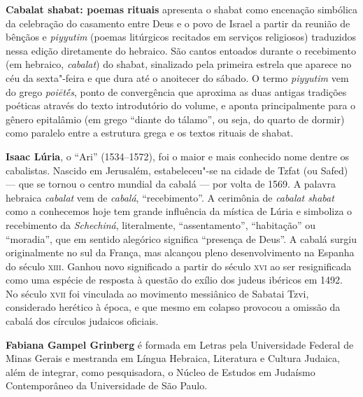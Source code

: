 \textbf{Cabalat shabat: poemas rituais} apresenta o shabat como encenação simbólica da celebração do casamento entre Deus e o povo de Israel a partir da reunião de bênçãos e \emph{piyyutim} (poemas litúrgicos recitados em serviços religiosos) traduzidos nessa edição diretamente do hebraico. São cantos entoados durante o recebimento (em hebraico, \emph{cabalat}) do shabat, sinalizado pela primeira estrela que aparece no céu da sexta"-feira e que dura até o anoitecer do sábado. O termo \emph{piyyutim} vem do grego \emph{poiētḗs}, ponto de convergência que aproxima as duas antigas tradições poéticas através do texto introdutório do volume, e aponta principalmente para o gênero epitalâmio (em grego ``diante do tálamo'', ou seja, do quarto de dormir) como paralelo entre a estrutura grega e os textos rituais de shabat.

\textbf{Isaac Lúria}, o ``Ari'' (1534--1572), foi o maior e mais conhecido nome dentre os cabalistas. Nascido em Jerusalém, estabeleceu"-se na cidade de Tzfat (ou Safed) --- que se tornou o centro mundial da cabalá --- por volta de 1569. A palavra hebraica \emph{cabalat} vem de \emph{cabalá}, ``recebimento''. A cerimônia de \emph{cabalat shabat} como a conhecemos hoje tem grande influência da mística de Lúria e simboliza o recebimento da \emph{Schechiná}, literalmente, ``assentamento'', ``habitação'' ou ``moradia'', que em sentido alegórico significa ``presença de Deus''. A cabalá surgiu originalmente no sul da França, mas alcançou pleno desenvolvimento na Espanha do século \textsc{xiii}. Ganhou novo significado a partir do século \textsc{xvi} ao ser resignificada como uma espécie de resposta à questão do exílio dos judeus ibéricos em 1492. No século \textsc{xvii} foi vinculada ao movimento messiânico de Sabatai Tzvi, considerado herético à época, e que mesmo em colapso provocou a omissão da cabalá dos círculos judaicos oficiais.

\textbf{Fabiana Gampel Grinberg} é formada em Letras pela Universidade Federal de Minas Gerais e mestranda em Língua Hebraica, Literatura e Cultura Judaica, além de integrar, como pesquisadora, o Núcleo de Estudos em Judaísmo Contemporâneo da Universidade de São Paulo.



